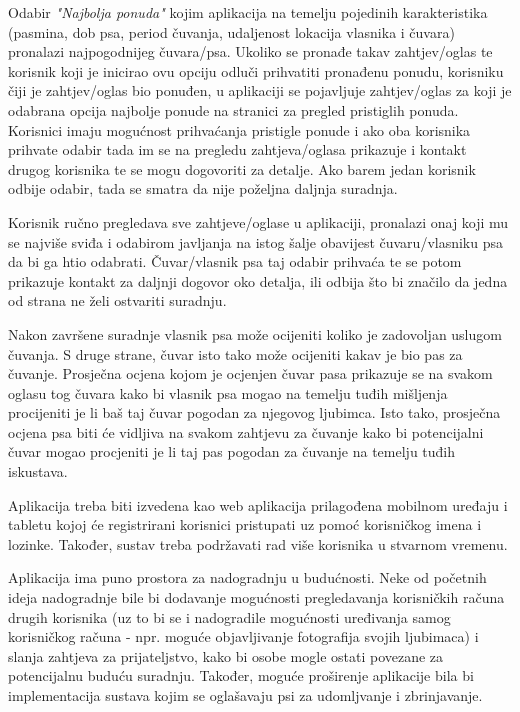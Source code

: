 		\begin{packed_item}
			
			\item Odabir \textit{"Najbolja ponuda"} kojim aplikacija na temelju pojedinih karakteristika (pasmina, dob psa, period čuvanja, udaljenost lokacija vlasnika i čuvara) pronalazi najpogodnijeg čuvara/psa. Ukoliko se pronađe takav zahtjev/oglas te korisnik koji je inicirao ovu opciju odluči prihvatiti pronađenu ponudu, korisniku čiji je zahtjev/oglas bio ponuđen, u aplikaciji se pojavljuje zahtjev/oglas za koji je odabrana opcija najbolje ponude na stranici za pregled pristiglih ponuda. Korisnici imaju mogućnost prihvaćanja pristigle ponude i ako oba korisnika prihvate odabir tada im se na pregledu zahtjeva/oglasa prikazuje i kontakt drugog korisnika te se mogu dogovoriti za detalje. Ako barem jedan korisnik odbije odabir, tada se smatra da nije poželjna daljnja suradnja.
			\item Korisnik ručno pregledava sve zahtjeve/oglase u aplikaciji, pronalazi onaj koji mu se najviše sviđa i odabirom javljanja na istog šalje obavijest čuvaru/vlasniku psa da bi ga htio odabrati. Čuvar/vlasnik psa taj odabir prihvaća te se potom prikazuje kontakt za daljnji dogovor oko detalja, ili odbija što bi značilo da jedna od strana ne želi ostvariti suradnju.
			
		\end{packed_item}
		
		Nakon završene suradnje  vlasnik psa može ocijeniti koliko je zadovoljan uslugom čuvanja. S druge strane, čuvar isto tako može ocijeniti kakav je bio pas za čuvanje. Prosječna ocjena kojom je ocjenjen čuvar pasa prikazuje se na svakom oglasu tog čuvara kako bi vlasnik psa mogao na temelju tuđih mišljenja procijeniti je li baš taj čuvar pogodan za njegovog ljubimca. Isto tako, prosječna ocjena psa biti će vidljiva na svakom zahtjevu za čuvanje kako bi potencijalni čuvar mogao procjeniti je li taj pas pogodan za čuvanje na temelju tuđih iskustava.
		
		Aplikacija treba biti izvedena kao web aplikacija prilagođena mobilnom uređaju i tabletu kojoj će registrirani korisnici pristupati uz pomoć korisničkog imena i lozinke. Također, sustav treba podržavati rad više korisnika u stvarnom vremenu.\newline
		
		
		
		Aplikacija ima puno prostora za nadogradnju u budućnosti. Neke od početnih ideja nadogradnje bile bi 
		dodavanje mogućnosti pregledavanja korisničkih računa drugih korisnika (uz to bi se i nadogradile mogućnosti uređivanja samog korisničkog računa - npr. moguće objavljivanje fotografija svojih ljubimaca) i slanja zahtjeva za prijateljstvo, kako bi osobe mogle ostati povezane za potencijalnu buduću suradnju. Također, moguće proširenje aplikacije bila bi implementacija sustava kojim se oglašavaju psi za udomljvanje i zbrinjavanje.\newline
		
